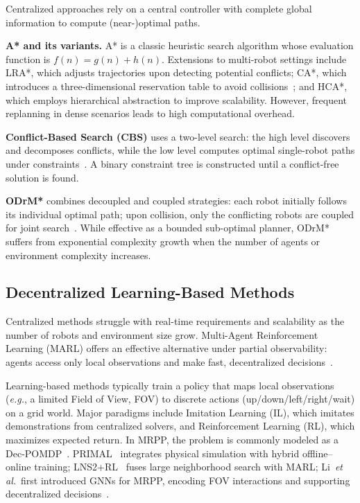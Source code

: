 \documentclass[conference]{IEEEtran}
\newcommand{\eg}{\textit{e.g.}}
\newcommand{\etal}{\textit{et al.}}
\begin{document}
Centralized approaches rely on a central controller with
complete global information to compute (near-)optimal paths.

\textbf{A* and its variants.}
A* is a classic heuristic search algorithm whose evaluation
function is $f(n)=g(n)+h(n)$.
Extensions to multi-robot settings include LRA*, which adjusts
trajectories upon detecting potential conflicts; CA*, which
introduces a three-dimensional reservation table to avoid
collisions~\cite{silver2005cooperative}; and HCA*, which
employs hierarchical abstraction to improve scalability.
However, frequent replanning in dense scenarios leads to
high computational overhead.

\textbf{Conflict-Based Search (CBS)} uses a two-level search:
the high level discovers and decomposes conflicts, while the low
level computes optimal single-robot paths under
constraints~\cite{sharon2015cbs}.
A binary constraint tree is constructed until a conflict-free
solution is found.

\textbf{ODrM*} combines decoupled and coupled strategies: each
robot initially follows its individual optimal path; upon
collision, only the conflicting robots are coupled for joint
search~\cite{ren2021subdimensional,ellis2021mapf}.
While effective as a bounded sub-optimal planner, ODrM* suffers
from exponential complexity growth when the number of agents or
environment complexity increases.

\subsection{Decentralized Learning-Based Methods}

Centralized methods struggle with real-time requirements and
scalability as the number of robots and environment size grow.
Multi-Agent Reinforcement Learning (MARL) offers an effective
alternative under partial observability: agents access only
local observations and make fast, decentralized
decisions~\cite{huang2021strategic}.

Learning-based methods typically train a policy that maps local
observations (\eg, a limited Field of View, FOV) to discrete
actions (up/down/left/right/wait) on a grid world.
Major paradigms include Imitation Learning (IL), which imitates
demonstrations from centralized solvers, and Reinforcement
Learning (RL), which maximizes expected return.
In MRPP, the problem is commonly modeled as a
Dec-POMDP~\cite{huang2021strategic}.
PRIMAL~\cite{sartoretti2019primal} integrates physical simulation
with hybrid offline--online training;
LNS2+RL~\cite{wang2025lns2rl} fuses large neighborhood search
with MARL;
Li~\etal~first introduced GNNs for MRPP, encoding FOV
interactions and supporting decentralized
decisions~\cite{li2020gnn,li2021magat}.
\end{document}
